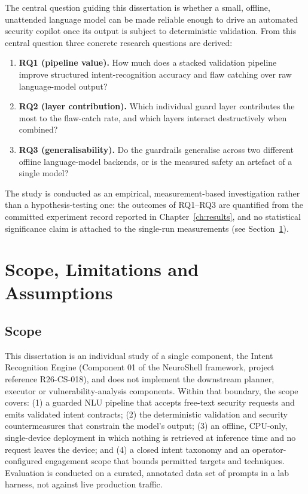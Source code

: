 The central question guiding this dissertation is whether a small, offline,
unattended language model can be made reliable enough to drive an automated
security copilot once its output is subject to deterministic validation.
From this central question three concrete research questions are derived:

\begin{enumerate}
\item \textbf{RQ1 (pipeline value).} How much does a stacked validation
pipeline improve structured intent-recognition accuracy and flaw catching over
raw language-model output?
\item \textbf{RQ2 (layer contribution).} Which individual guard layer
contributes the most to the flaw-catch rate, and which layers interact
destructively when combined?
\item \textbf{RQ3 (generalisability).} Do the guardrails generalise across two
different offline language-model backends, or is the measured safety an
artefact of a single model?
\end{enumerate}

The study is conducted as an empirical, measurement-based investigation rather
than a hypothesis-testing one: the outcomes of RQ1--RQ3 are quantified from the
committed experiment record reported in Chapter~\ref{ch:results}, and no
statistical significance claim is attached to the single-run measurements
(see Section~\ref{sec:scope-limitations-assumptions}).

\section{Scope, Limitations and Assumptions}\label{sec:scope-limitations-assumptions}

\subsection*{Scope}

This dissertation is an individual study of a single component, the Intent
Recognition Engine (Component 01 of the NeuroShell framework, project reference
R26-CS-018), and does not implement the downstream planner, executor or
vulnerability-analysis components. Within that boundary, the scope covers:
(1) a guarded NLU pipeline that accepts free-text security requests and emits
validated intent contracts; (2) the deterministic validation and security
countermeasures that constrain the model's output; (3) an offline, CPU-only,
single-device deployment in which nothing is retrieved at inference time and no
request leaves the device; and (4) a closed intent taxonomy and an
operator-configured engagement scope that bounds permitted targets and
techniques. Evaluation is conducted on a curated, annotated data set of prompts
in a lab harness, not against live production traffic.

